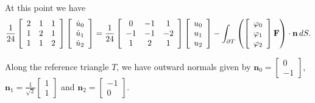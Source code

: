 \documentclass[letterpaper,10pt]{article}
\begin{document}
At this point we have
\[\frac{1}{24} \left[ \begin{array}{c c c}
2 & 1 & 1 \\
1 & 2 & 1 \\
1 & 1 & 2 \end{array}\right] \left[ \begin{array}{c}
\dot{u}_0 \\ \dot{u}_1 \\ \dot{u}_2 \end{array}\right] =
\frac{1}{24} \left[ \begin{array}{c c c}
0 & -1 & 1 \\
-1 & -1 & -2 \\
1 & 2 & 1 \end{array}\right] \left[ \begin{array}{c}
u_0 \\ u_1 \\ u_2 \end{array}\right] -
\int_{\partial T} \left(
\left[ \begin{array}{c}
\varphi_0 \\ \varphi_1 \\ \varphi_2 \end{array}\right]
\mathbf{F}\right) \cdot \mathbf{n} \, dS.\]

Along the reference triangle \(T\), we have outward normals given by
\(\mathbf{n}_0 = \left[ \begin{array}{c}
0 \\ -1 \end{array}\right]\), \(\mathbf{n}_1 = \frac{1}{\sqrt{2}}
\left[ \begin{array}{c} 1 \\ 1 \end{array}\right]\) and
\(\mathbf{n}_2 = \left[ \begin{array}{c}
-1 \\ 0 \end{array}\right]\).

\end{document}
